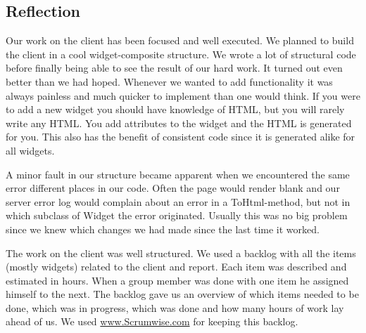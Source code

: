 \subsection{Reflection}
Our work on the client has been focused and well executed. We planned to build the client in a cool widget-composite structure. We wrote a lot of structural code before finally being able to see the result of our hard work. It turned out even better than we had hoped. Whenever we wanted to add functionality it was always painless and much quicker to implement than one would think. If you were to add a new widget you should have knowledge of HTML, but you will rarely write any HTML. You add attributes to the widget and the HTML is generated for you. This also has the benefit of consistent code since it is generated alike for all widgets.

A minor fault in our structure became apparent when we encountered the same error different places in our code. Often the page would render blank and our server error log would complain about an error in a ToHtml-method, but not in which subclass of Widget the error originated. Usually this was no big problem since we knew which changes we had made since the last time it worked.

The work on the client was well structured. We used a backlog with all the items (mostly widgets) related to the client and report. Each item was described and estimated in hours. When a group member was done with one item he assigned himself to the next. The backlog gave us an overview of which items needed to be done, which was in progress, which was done and how many hours of work lay ahead of us. We used \url{www.Scrumwise.com} for keeping this backlog.
\newpage